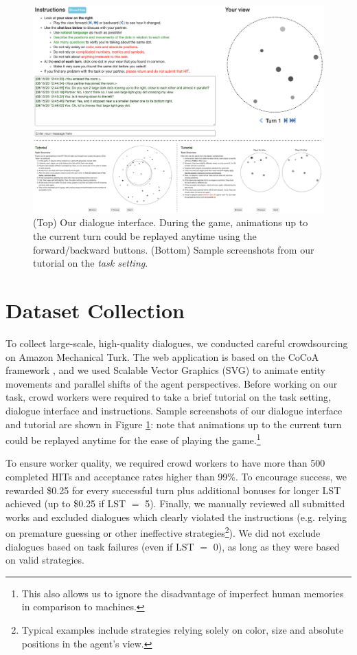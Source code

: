 \begin{figure}[t!]
\centering
\includegraphics[width=\textwidth]{user_interfaces.pdf}
\caption{(Top) Our dialogue interface. During the game, animations up to the current turn could be replayed anytime using the forward/backward buttons. (Bottom) Sample screenshots from our tutorial on the \textit{task setting}.
}
\label{06_fig:user_interfaces}
\end{figure}

\section{Dataset Collection}
\label{06_sec:dataset_collection}

To collect large-scale, high-quality dialogues, we conducted careful crowdsourcing on Amazon Mechanical Turk. The web application is based on the CoCoA framework \citep{he2017learning}, and we used Scalable Vector Graphics (SVG) to animate entity movements and parallel shifts of the agent perspectives. Before working on our task, crowd workers were required to take a brief tutorial on the task setting, dialogue interface and instructions. Sample screenshots of our dialogue interface and tutorial are shown in Figure \ref{06_fig:user_interfaces}: note that animations up to the current turn could be replayed anytime for the ease of playing the game.\footnote{This also allows us to ignore the disadvantage of imperfect human memories in comparison to machines.}

To ensure worker quality, we required crowd workers to have more than 500 completed HITs and acceptance rates higher than 99\%. To encourage success, we rewarded \$0.25 for every successful turn plus additional bonuses for longer LST achieved (up to \$0.25 if LST $=$ 5). Finally, we manually reviewed all submitted works and excluded dialogues which clearly violated the instructions (e.g. relying on premature guessing or other ineffective strategies\footnote{Typical examples include strategies relying solely on color, size and absolute positions in the agent's view.}). We did not exclude dialogues based on task failures (even if LST $=$ 0), as long as they were based on valid strategies.

